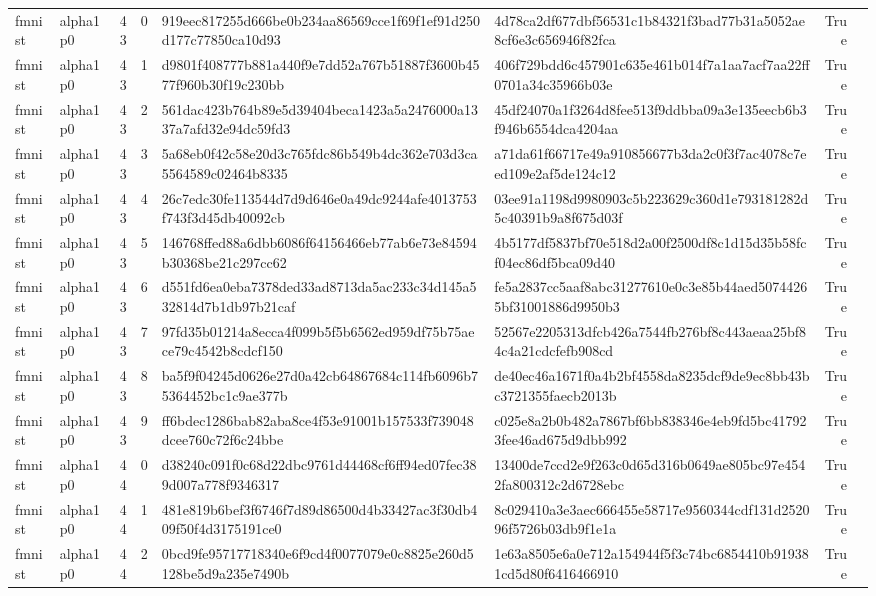 \begin{tabular}{llrrllrl}
fmnist & alpha1p0 & 43 & 0 & 919eec817255d666be0b234aa86569cce1f69f1ef91d250d177c77850ca10d93 & 4d78ca2df677dbf56531c1b84321f3bad77b31a5052ae8cf6e3c656946f82fca & True &  \\
fmnist & alpha1p0 & 43 & 1 & d9801f408777b881a440f9e7dd52a767b51887f3600b4577f960b30f19c230bb & 406f729bdd6c457901c635e461b014f7a1aa7acf7aa22ff0701a34c35966b03e & True &  \\
fmnist & alpha1p0 & 43 & 2 & 561dac423b764b89e5d39404beca1423a5a2476000a1337a7afd32e94dc59fd3 & 45df24070a1f3264d8fee513f9ddbba09a3e135eecb6b3f946b6554dca4204aa & True &  \\
fmnist & alpha1p0 & 43 & 3 & 5a68eb0f42c58e20d3c765fdc86b549b4dc362e703d3ca5564589c02464b8335 & a71da61f66717e49a910856677b3da2c0f3f7ac4078c7eed109e2af5de124c12 & True &  \\
fmnist & alpha1p0 & 43 & 4 & 26c7edc30fe113544d7d9d646e0a49dc9244afe4013753f743f3d45db40092cb & 03ee91a1198d9980903c5b223629c360d1e793181282d5c40391b9a8f675d03f & True &  \\
fmnist & alpha1p0 & 43 & 5 & 146768ffed88a6dbb6086f64156466eb77ab6e73e84594b30368be21c297cc62 & 4b5177df5837bf70e518d2a00f2500df8c1d15d35b58fcf04ec86df5bca09d40 & True &  \\
fmnist & alpha1p0 & 43 & 6 & d551fd6ea0eba7378ded33ad8713da5ac233c34d145a532814d7b1db97b21caf & fe5a2837cc5aaf8abc31277610e0c3e85b44aed50744265bf31001886d9950b3 & True &  \\
fmnist & alpha1p0 & 43 & 7 & 97fd35b01214a8ecca4f099b5f5b6562ed959df75b75aece79c4542b8cdcf150 & 52567e2205313dfcb426a7544fb276bf8c443aeaa25bf84c4a21cdcfefb908cd & True &  \\
fmnist & alpha1p0 & 43 & 8 & ba5f9f04245d0626e27d0a42cb64867684c114fb6096b75364452bc1c9ae377b & de40ec46a1671f0a4b2bf4558da8235dcf9de9ec8bb43bc3721355faecb2013b & True &  \\
fmnist & alpha1p0 & 43 & 9 & ff6bdec1286bab82aba8ce4f53e91001b157533f739048dcee760c72f6c24bbe & c025e8a2b0b482a7867bf6bb838346e4eb9fd5bc417923fee46ad675d9dbb992 & True &  \\
fmnist & alpha1p0 & 44 & 0 & d38240c091f0c68d22dbc9761d44468cf6ff94ed07fec389d007a778f9346317 & 13400de7ccd2e9f263c0d65d316b0649ae805bc97e4542fa800312c2d6728ebc & True &  \\
fmnist & alpha1p0 & 44 & 1 & 481e819b6bef3f6746f7d89d86500d4b33427ac3f30db409f50f4d3175191ce0 & 8c029410a3e3aec666455e58717e9560344cdf131d252096f5726b03db9f1e1a & True &  \\
fmnist & alpha1p0 & 44 & 2 & 0bcd9fe95717718340e6f9cd4f0077079e0c8825e260d5128be5d9a235e7490b & 1e63a8505e6a0e712a154944f5f3c74bc6854410b919381cd5d80f6416466910 & True &  \\

\end{tabular}
